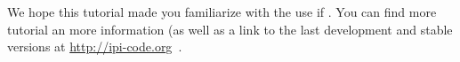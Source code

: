 \documentclass{article}
\begin{document}
We hope this tutorial made you familiarize with the use if \ipi. You
can find more tutorial an more information (as well as a link to the
last development and stable versions at \url{http://ipi-code.org}~\cite{CP2K}.





\end{document}
